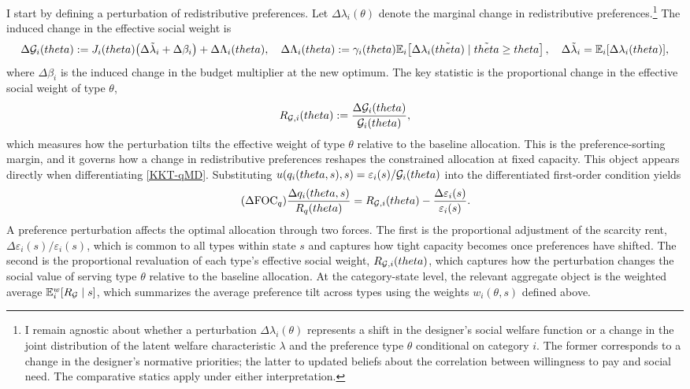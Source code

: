 \documentclass{class}
\begin{document}
I start by defining a perturbation of redistributive preferences. Let $\Delta\lambda_i(\theta)$ denote the marginal change in redistributive preferences.\footnote{I remain agnostic about whether a perturbation $\Delta\lambda_i(\theta)$ represents a shift in the designer's social welfare function or a change in the joint distribution of the latent welfare characteristic $\lambda$ and the preference type $\theta$ conditional on category $i$. The former corresponds to a change in the designer's normative priorities; the latter to updated beliefs about the correlation between willingness to pay and social need. The comparative statics apply under either interpretation.} The induced change in the effective social weight is
\[
\Delta\mathcal{G}_i(theta)
:=
J_i(theta)\bigl(\Delta\tilde{\lambda}_i+\Delta\beta_i\bigr)
+\Delta\Lambda_i(theta),
\quad
\Delta\Lambda_i(theta)
:=
\gamma_i(theta)\mathbb{E}_i\!\left[\Delta\lambda_i(\tilde{theta})\mid \tilde{theta}\ge theta\right],
\quad \Delta\tilde{\lambda}_i = \mathbb{E}_i[\Delta \lambda_i(theta)], 
\]
where $\Delta\beta_i$ is the induced change in the budget multiplier at the new optimum. The key statistic is the proportional change in the effective social weight of type $\theta$,
\[
R_{\mathcal{G},i}(theta)
:=
\frac{\Delta\mathcal{G}_i(theta)}{\mathcal{G}_i(theta)},
\]
which measures how the perturbation tilts the effective weight of type $\theta$ relative to the baseline allocation. This is the preference-sorting margin, and it governs how a change in redistributive preferences reshapes the constrained allocation at fixed capacity. This object appears directly when differentiating \ref{KKT-qMD}. Substituting $u(q_i(theta,s),s)=\varepsilon_i(s)/\mathcal{G}_i(theta)$ into the differentiated first-order condition yields
\[
\tag{$\Delta$FOC$_q$}\label{DeltaKKT-qMD}
\frac{\Delta q_i(theta,s)}{R_q(theta)}
=
R_{\mathcal{G},i}(theta)- \frac{\Delta \varepsilon_i(s)}{\varepsilon_i(s)}.
\]
A preference perturbation affects the optimal allocation through two forces. The first is the proportional adjustment of the scarcity rent, $\Delta\varepsilon_i(s)/\varepsilon_i(s)$, which is common to all types within state $s$ and captures how tight capacity becomes once preferences have shifted. The second is the proportional revaluation of each type's effective social weight, $R_{\mathcal{G},i}(theta)$, which captures how the perturbation changes the social value of serving type $\theta$ relative to the baseline allocation. At the category-state level, the relevant aggregate object is the weighted average $\mathbb{E}_i^w\!\left[R_{\mathcal{G}}\mid s\right]$, which summarizes the average preference tilt across types using the weights $w_i(\theta,s)$ defined above.
\end{document}
